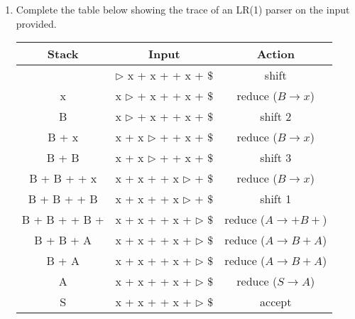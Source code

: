 \begin{enumerate}
      \item Complete the table below showing the trace of an LR(1) parser on the input provided.
          \begin{center}
            \begin{tabular}{c c c}
               Stack & Input & Action\\
               \hline
                 & $\triangleright$ x + x + + x + $\$$ & shift\\
                 x & x $\triangleright$ + x + + x + $\$$ & reduce ($B \rightarrow x$)\\
                 B & x $\triangleright$ + x + + x + $\$$& shift 2\\
                 B + x & x + x $\triangleright$ + + x + $\$$ & reduce ($B \rightarrow x$)\\
                 B + B & x + x $\triangleright$ + + x + $\$$ & shift 3\\
                 B + B + + x & x + x + + x $\triangleright$ + $\$$ & reduce ($B \rightarrow x$)\\
                 B + B + + B & x + x + + x $\triangleright$ + $\$$ & shift 1\\
                 B + B + + B + & x + x + + x + $\triangleright$ $\$$ & reduce ($A \rightarrow +B+$)\\
                 B + B + A & x + x + + x + $\triangleright$ $\$$ & reduce ($A \rightarrow B + A$)\\
                 B + A & x + x + + x + $\triangleright$ $\$$ & reduce ($A \rightarrow B + A$)\\
                 A & x + x + + x + $\triangleright$ $\$$ & reduce ($S \rightarrow A$)\\
                 S & x + x + + x + $\triangleright$ $\$$ & accept\\
               
            \end{tabular}
          \end{center}

\end{enumerate}



